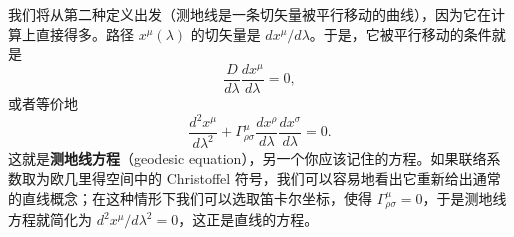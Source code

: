 
我们将从第二种定义出发（测地线是一条切矢量被平行移动的曲线），因为它在计算上直接得多。路径 $x^\mu(\lambda)$ 的切矢量是 $dx^\mu/d\lambda$。于是，它被平行移动的条件就是
\begin{equation*}
\frac{D}{d\lambda}\frac{dx^\mu}{d\lambda} = 0,
\tag{3.43}
\end{equation*}
或者等价地
\begin{equation*}
\boxed{\;\frac{d^2x^\mu}{d\lambda^2} + \Gamma^\mu_{\rho\sigma}\frac{dx^\rho}{d\lambda}\frac{dx^\sigma}{d\lambda} = 0.\;}
\tag{3.44}
\end{equation*}
这就是\textbf{测地线方程}（geodesic equation），另一个你应该记住的方程。如果联络系数取为欧几里得空间中的 Christoffel 符号，我们可以容易地看出它重新给出通常的直线概念；在这种情形下我们可以选取笛卡尔坐标，使得 $\Gamma^\mu_{\rho\sigma} = 0$，于是测地线方程就简化为 $d^2x^\mu/d\lambda^2 = 0$，这正是直线的方程。

